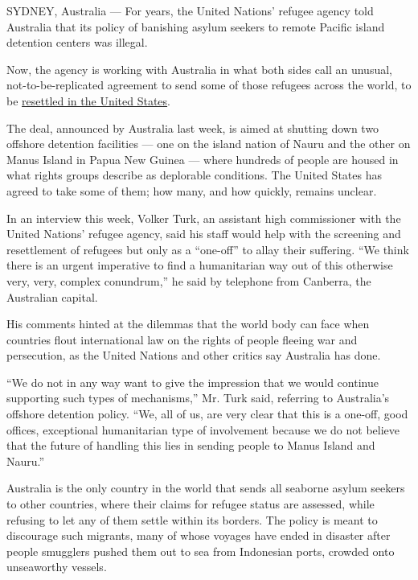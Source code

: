 SYDNEY, Australia --- For years, the United Nations' refugee agency told
Australia that its policy of banishing asylum seekers to remote Pacific
island detention centers was illegal.

Now, the agency is working with Australia in what both sides call an
unusual, not-to-be-replicated agreement to send some of those refugees
across the world, to be
\href{http://www.nytimes.com/2016/11/13/world/australia/australia-refugees-united-states.html}{resettled
in the United States}.

The deal, announced by Australia last week, is aimed at shutting down
two offshore detention facilities --- one on the island nation of Nauru
and the other on Manus Island in Papua New Guinea --- where hundreds of
people are housed in what rights groups describe as deplorable
conditions. The United States has agreed to take some of them; how many,
and how quickly, remains unclear.

In an interview this week, Volker Turk, an assistant high commissioner
with the United Nations' refugee agency, said his staff would help with
the screening and resettlement of refugees but only as a ``one-off'' to
allay their suffering. ``We think there is an urgent imperative to find
a humanitarian way out of this otherwise very, very, complex
conundrum,'' he said by telephone from Canberra, the Australian capital.

His comments hinted at the dilemmas that the world body can face when
countries flout international law on the rights of people fleeing war
and persecution, as the United Nations and other critics say Australia
has done.

``We do not in any way want to give the impression that we would
continue supporting such types of mechanisms,'' Mr. Turk said, referring
to Australia's offshore detention policy. ``We, all of us, are very
clear that this is a one-off, good offices, exceptional humanitarian
type of involvement because we do not believe that the future of
handling this lies in sending people to Manus Island and Nauru.''

Australia is the only country in the world that sends all seaborne
asylum seekers to other countries, where their claims for refugee status
are assessed, while refusing to let any of them settle within its
borders. The policy is meant to discourage such migrants, many of whose
voyages have ended in disaster after people smugglers pushed them out to
sea from Indonesian ports, crowded onto unseaworthy vessels.

